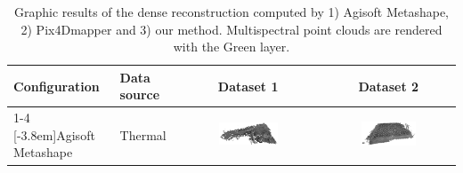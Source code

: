 \begin{table}[htb]
    \centering
    \caption{Graphic results of the dense reconstruction computed by 1) Agisoft Metashape, 2) Pix4Dmapper and 3) our method. Multispectral point clouds are rendered with the Green layer. }
    \label{table:visual_results}  
    \newcommand\imageTableSize{0.44\textwidth}
    \begin{tabular}{l|l|c|c}
    \toprule
    \textbf{Configuration} & \textbf{Data source} &\textbf{Dataset 1} & \textbf{Dataset 2}\\
    \cmidrule{1-4}
    \multirow{2}{*}[-3.8em]{Agisoft Metashape} & Thermal & \multicolumn{1}{m{\imageTableSize}|}{\includegraphics[width=\imageTableSize]{figs/multi_thermal_projection/results/metashape/AgisoftThermalMarmolejo.png}} & \multicolumn{1}{m{\imageTableSize}}{\includegraphics[width=\imageTableSize]{figs/multi_thermal_projection/results/metashape/AgisoftThermalNovember.png}}\\

\end{tabular}
\end{table}
